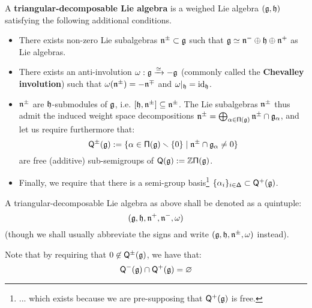         \begin{definition} \label{def: triangular_decomposable_lie_algebras}
            A \textbf{triangular-decomposable Lie algebra} is a weighed Lie algebra $(\mathfrak{g}, \mathfrak{h})$ satisfying the following additional conditions.
            \begin{itemize}
                \item There exists non-zero Lie subalgebras $\mathfrak{n}^{\pm} \subset \mathfrak{g}$ such that $\mathfrak{g} \simeq \mathfrak{n}^- \oplus \mathfrak{h} \oplus \mathfrak{n}^+$ as Lie algebras.
                \item There exists an anti-involution $\omega: \mathfrak{g} \xrightarrow[]{\simeq} -\mathfrak{g}$ (commonly called the \textbf{Chevalley involution}) such that $\omega(\mathfrak{n}^{\pm}) = -\mathfrak{n}^{\mp}$ and $\omega|_{\mathfrak{h}} = \mathrm{id}_{\mathfrak{h}}$.
                \item $\mathfrak{n}^{\pm}$ are $\mathfrak{h}$-submodules of $\mathfrak{g}$, i.e. $[\mathfrak{h}, \mathfrak{n}^{\pm}] \subseteq \mathfrak{n}^{\pm}$. The Lie subalgebras $\mathfrak{n}^{\pm}$ thus admit the induced weight space decompositions $\mathfrak{n}^{\pm} = \bigoplus_{\alpha \in \mathsf{\Pi}(\mathfrak{g})} \mathfrak{n}^{\pm} \cap \mathfrak{g}_{\alpha}$, and let us require furthermore that:
                    $$\mathsf{Q}^{\pm}(\mathfrak{g}) := \{ \alpha \in \mathsf{\Pi}(\mathfrak{g}) \smallsetminus \{0\} \mid \mathfrak{n}^{\pm} \cap \mathfrak{g}_{\alpha} \not = 0 \}$$
                are free (additive) sub-semigroups of $\mathsf{Q}(\mathfrak{g}) := \mathbb{Z}\mathsf{\Pi}(\mathfrak{g})$.
                \item Finally, we require that there is a semi-group basis\footnote{... which exists because we are pre-supposing that $\mathsf{Q}^+(\mathfrak{g})$ is free.} $\{\alpha_i\}_{i \in \mathsf{\Delta}} \subset \mathsf{Q}^+(\mathfrak{g})$.
            \end{itemize}
            A triangular-decomposable Lie algebra as above shall be denoted as a quintuple:
                $$(\mathfrak{g}, \mathfrak{h}, \mathfrak{n}^+, \mathfrak{n}^-, \omega)$$
            (though we shall usually abbreviate the signs and write $(\mathfrak{g}, \mathfrak{h}, \mathfrak{n}^{\pm}, \omega)$ instead).
        \end{definition}
        \begin{remark}
            Note that by requiring that $0 \not \in \mathsf{Q}^{\pm}(\mathfrak{g})$, we have that:
                $$\mathsf{Q}^-(\mathfrak{g}) \cap \mathsf{Q}^+(\mathfrak{g}) = \varnothing$$
        \end{remark}
        
